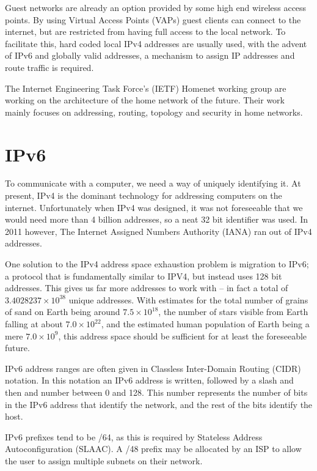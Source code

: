 \documentclass[12pt]{report}
\begin{document}
Guest networks are already an option provided by some high end wireless access
points. By using Virtual Access Points (VAPs)  guest clients can connect to the internet, but are restricted from
having full access to the local network. To facilitate this, hard coded local
IPv4 addresses are usually used, with the advent of IPv6 and globally valid
addresses, a mechanism to assign IP addresses and route traffic is required. 

The Internet Engineering Task Force's (IETF) Homenet working group
\cite{homenet} are working on the architecture of the home network of the
future. Their work mainly focuses on addressing, routing, topology and security
in home networks. 

\section{IPv6}
To communicate with a computer, we need a way of uniquely identifying it. At
present, IPv4 is the dominant technology for addressing computers on the
internet. Unfortunately when IPv4 was designed, it was not foreseeable that we
would need more than 4 billion addresses, so a neat 32 bit identifier was used.
In 2011 however, The Internet Assigned Numbers Authority (IANA)
 ran out of IPv4
addresses. 

One solution to the IPv4 address space exhaustion problem is migration to
IPv6; a protocol that is fundamentally similar to IPV4, but instead uses 128
bit addresses. This gives us far more addresses to work with -- in fact a total
of $3.4028237\times10^{38}$ unique addresses. With estimates for the total
number of grains of sand on Earth being around $7.5\times10^{18}$, the number
of stars visible from Earth falling at about $7.0\times10^{22}$, and the
estimated human population of Earth being a mere $7.0\times10^{9}$,
this address space should be sufficient for at least the foreseeable future. 

IPv6 address ranges are often given in Classless Inter-Domain Routing (CIDR)
 notation. In this notation
an IPv6 address is written, followed by a slash and then and number between 0
and 128. This number represents the number of bits in the IPv6 address that
identify the network, and the rest of the bits identify the host.

IPv6 prefixes tend to be /64, as this is required by Stateless Address
Autoconfiguration (SLAAC). A /48 prefix may be allocated by an ISP to allow the user
to assign multiple subnets on their network.
\end{document}
